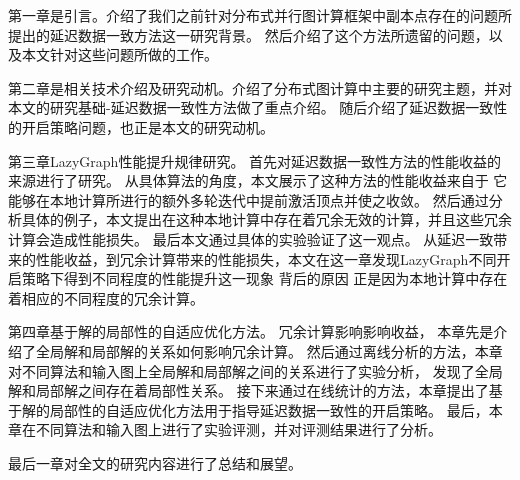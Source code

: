 第一章是引言。介绍了我们之前针对分布式并行图计算框架中副本点存在的问题所提出的延迟数据一致方法这一研究背景。
然后介绍了这个方法所遗留的问题，以及本文针对这些问题所做的工作。

第二章是相关技术介绍及研究动机。介绍了分布式图计算中主要的研究主题，并对本文的研究基础-延迟数据一致性方法做了重点介绍。
随后介绍了延迟数据一致性的开启策略问题，也正是本文的研究动机。

第三章LazyGraph性能提升规律研究。
首先对延迟数据一致性方法的性能收益的来源进行了研究。
从具体算法的角度，本文展示了这种方法的性能收益来自于 它能够在本地计算所进行的额外多轮迭代中提前激活顶点并使之收敛。
然后通过分析具体的例子，本文提出在这种本地计算中存在着冗余无效的计算，并且这些冗余计算会造成性能损失。
最后本文通过具体的实验验证了这一观点。
从延迟一致带来的性能收益，到冗余计算带来的性能损失，本文在这一章发现LazyGraph不同开启策略下得到不同程度的性能提升这一现象
背后的原因
正是因为本地计算中存在着相应的不同程度的冗余计算。

第四章基于解的局部性的自适应优化方法。
冗余计算影响影响收益，
本章先是介绍了全局解和局部解的关系如何影响冗余计算。
然后通过离线分析的方法，本章对不同算法和输入图上全局解和局部解之间的关系进行了实验分析，
发现了全局解和局部解之间存在着局部性关系。
接下来通过在线统计的方法，本章提出了基于解的局部性的自适应优化方法用于指导延迟数据一致性的开启策略。
最后，本章在不同算法和输入图上进行了实验评测，并对评测结果进行了分析。

最后一章对全文的研究内容进行了总结和展望。




